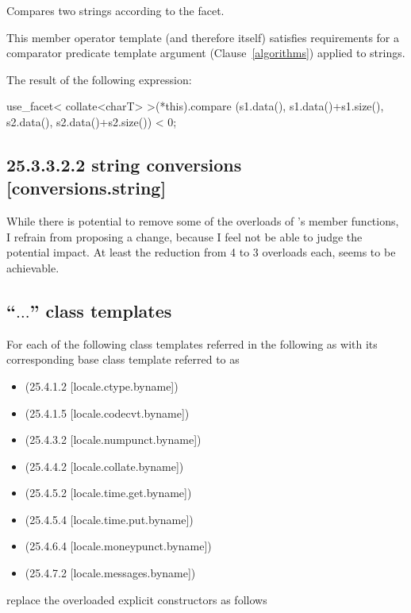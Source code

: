 \documentclass[ebook,11pt,article]{memoir}
\begin{document}
\begin{itemdescr}
\pnum
\effects
Compares two strings according to the
facet.

\pnum
\remarks
This member operator template (and therefore
itself) satisfies requirements for a comparator predicate template argument
(Clause~\ref{algorithms}) applied to strings.

\pnum
\returns
The result of the following expression:

\begin{codeblock}
use_facet< collate<charT> >(*this).compare
  (s1.data(), s1.data()+s1.size(), s2.data(), s2.data()+s2.size()) < 0;
\end{codeblock}
\end{itemdescr}

\subsection{25.3.3.2.2 string conversions [conversions.string]}
While there is potential to remove some of the overloads of 's member functions, I refrain from proposing a change, because I feel not be able to judge the potential impact. At least the reduction from 4 to 3 overloads each, seems to be achievable.

\subsection{ ``$\ldots$'' class templates }
For each of the following class templates referred in the following as  with its corresponding base class template referred to as 
\begin{itemize}
\item {} (25.4.1.2 [locale.ctype.byname])
\item {} (25.4.1.5 [locale.codecvt.byname])
\item {} (25.4.3.2 [locale.numpunct.byname])
\item {} (25.4.4.2 [locale.collate.byname])
\item {} (25.4.5.2 [locale.time.get.byname])
\item {} (25.4.5.4 [locale.time.put.byname])
\item {} (25.4.6.4 [locale.moneypunct.byname])
\item {} (25.4.7.2 [locale.messages.byname])
\end{itemize}
replace the overloaded explicit constructors as follows
\end{document}
